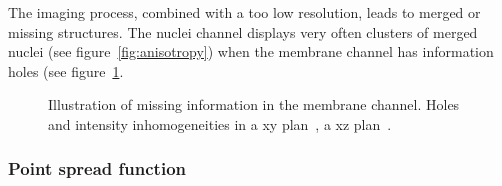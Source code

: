 The imaging process, combined with a too low resolution, leads to merged or missing structures. The nuclei channel displays very often clusters of merged nuclei (see figure~\ref{fig:anisotropy}) when the membrane channel has information holes (see figure~\ref{fig:holesMembrane}.
\begin{figure}[htb]
  \centering
  \captionsetup[subfloat]{labelformat=empty}
  \hspace{5pt}
\caption{%
Illustration of missing information in the membrane channel. Holes and intensity inhomogeneities in a xy plan~, a xz plan~.}
\label{fig:holesMembrane}
\end{figure}


\subsubsection{Point spread function}

